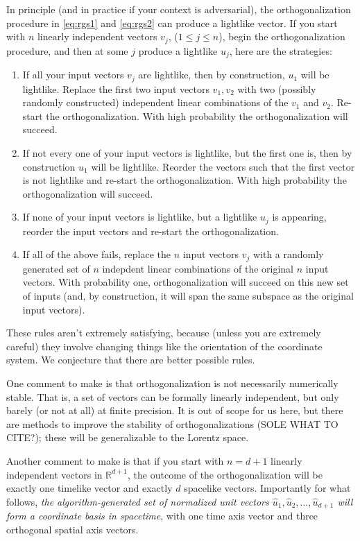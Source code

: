 \documentclass{article}
\begin{document}
In principle (and in practice if your context is adversarial), the orthogonalization procedure in \eqref{eq:rgs1} and \eqref{eq:rgs2} can produce a lightlike vector.
If you start with $n$ linearly independent vectors $v_j$, ($1\leq j\leq n$), begin the orthogonalization procedure, and then at some $j$ produce a lightlike $u_j$, here are the strategies:
\begin{enumerate}
    \item If all your input vectors $v_j$ are lightlike, then by construction, $u_1$ will be lightlike.
    Replace the first two input vectors $v_1, v_2$ with two (possibly randomly constructed) independent linear combinations of the $v_1$ and $v_2$.
    Re-start the orthogonalization.
    With high probability the orthogonalization will succeed.
    \item If not every one of your input vectors is lightlike, but the first one is, then by construction $u_1$ will be lightlike.
    Reorder the vectors such that the first vector is not lightlike and re-start the orthogonalization.
    With high probability the orthogonalization will succeed.
    \item If none of your input vectors is lightlike, but a lightlike $u_j$ is appearing, reorder the input vectors and re-start the orthogonalization.
    \item If all of the above fails, replace the $n$ input vectors $v_j$ with a randomly generated set of $n$ indepdent linear combinations of the original $n$ input vectors.
    With probability one, orthogonalization will succeed on this new set of inputs (and, by construction, it will span the same subspace as the original input vectors).
\end{enumerate}
These rules aren't extremely satisfying, because (unless you are extremely careful) they involve changing things like the orientation of the coordinate system.
We conjecture that there are better possible rules.

One comment to make is that orthogonalization is not necessarily numerically stable.
That is, a set of vectors can be formally linearly independent, but only barely (or not at all) at finite precision.
It is out of scope for us here, but there are methods to improve the stability of orthogonalizations (SOLE WHAT TO CITE?); these will be generalizable to the Lorentz space.

Another comment to make is that if you start with $n=d+1$ linearly independent vectors in $\mathbb{R}^{d+1}$, the outcome of the orthogonalization will be exactly one timelike vector and exactly $d$ spacelike vectors.
Importantly for what follows, \emph{the algorithm-generated set of normalized unit vectors $\hat{u}_1,\hat{u}_2,\ldots,\hat{u}_{d+1}$ will form a coordinate basis in spacetime}, with one time axis vector and three orthogonal spatial axis vectors.
\end{document}
